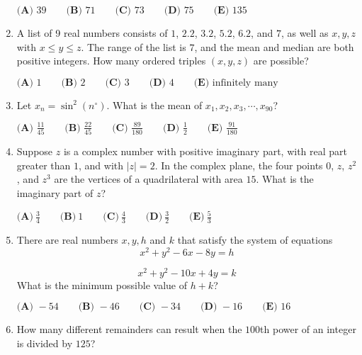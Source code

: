\documentclass{article}
\begin{document}
\begin{enumerate}[label=\arabic*., itemsep=0.5em]
\(
\textbf{(A) }39 \qquad
\textbf{(B) }71 \qquad
\textbf{(C) }73 \qquad
\textbf{(D) }75 \qquad
\textbf{(E) }135 \qquad
\)\par \vspace{0.5em}\item A list of 9 real numbers consists of \(1\), \(2.2 \), \(3.2 \), \(5.2 \), \(6.2 \), and \(7\), as well as \(x, y,z\) with \(x\leq y\leq z\). The range of the list is \(7\), and the mean and median are both positive integers. How many ordered triples \((x,y,z)\) are possible?

\(\textbf{(A) }1 \qquad\textbf{(B) }2 \qquad\textbf{(C) }3 \qquad\textbf{(D) }4 \qquad\textbf{(E) }\text{infinitely many}\qquad\)\par \vspace{0.5em}\item Let \(x_{n} = \sin^2(n^\circ)\). What is the mean of \(x_{1}, x_{2}, x_{3}, \cdots, x_{90}\)?

\(
\textbf{(A) }\frac{11}{45} \qquad
\textbf{(B) }\frac{22}{45} \qquad
\textbf{(C) }\frac{89}{180} \qquad
\textbf{(D) }\frac{1}{2} \qquad
\textbf{(E) }\frac{91}{180} \qquad
\)\par \vspace{0.5em}\item Suppose \(z\) is a complex number with positive imaginary part, with real part greater than \(1\), and with \(|z| = 2\). In the complex plane, the four points \(0\), \(z\), \(z^{2}\), and \(z^{3}\) are the vertices of a quadrilateral with area \(15\). What is the imaginary part of \(z\)?

\(\textbf{(A)}~\frac{3}{4}\qquad\textbf{(B)}~1\qquad\textbf{(C)}~\frac{4}{3}\qquad\textbf{(D)}~\frac{3}{2}\qquad\textbf{(E)}~\frac{5}{3}\)\par \vspace{0.5em}\item There are real numbers \(x,y,h\) and \(k\) that satisfy the system of equations
\begin{equation*}
x^2 + y^2 - 6x - 8y = h
\end{equation*}

\begin{equation*}
x^2 + y^2 - 10x + 4y = k
\end{equation*}
What is the minimum possible value of \(h+k\)?

\(
\textbf{(A) }-54 \qquad
\textbf{(B) }-46 \qquad
\textbf{(C) }-34 \qquad
\textbf{(D) }-16 \qquad
\textbf{(E) }16 \qquad
\)\par \vspace{0.5em}\item How many different remainders can result when the \(100\)th power of an integer is divided by \(125\)?


\end{enumerate}
\end{document}
